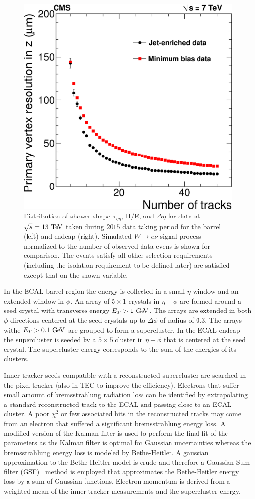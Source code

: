 \begin{figure}[h]
\includegraphics[width=0.32\columnwidth]{figures_chapter4/vertex_resolution}
\caption{Distribution of shower shape $\sigma_{\eta \eta}$, H/E, and $\Delta \eta$ for data at $\sqrt{s}=13~\mathrm{Te\kern -0.1em V}$ taken during $2015$ data taking period for the barrel (left) and endcap (right). Simulated $W \rightarrow e \nu$ signal process normalized to the number of observed data evens is shown for comparison. The events satisfy all other selection requirements (including the isolation requirement to be defined later) are satisfied except that on the shown variable.}
\label{fig:ele_id}
\end{figure}

In the ECAL barrel region the energy is collected in a small $\eta$ window and an extended window in $\phi$.  An array of $5\times1$ crystals in $\eta-\phi$ are formed around a seed crystal with transverse energy $E_{T}>1~\mathrm{Ge\kern -0.1em V}$. The arrays are extended in both $\phi$ directions centered at the seed crystals up to $\Delta \phi$ of radius of $0.3$. The arrays withe $E_{T}>0.1~\mathrm{Ge\kern -0.1em V}$ are grouped to form a supercluster. In the ECAL endcap the supercluster is seeded by a $5\times5$ cluster in $\eta-\phi$ that is centered at the seed crystal. The supercluster energy corresponds to the sum of the energies of its clusters. 

Inner tracker seeds compatible with a reconstructed supercluster are searched in the pixel tracker (also in TEC to improve the efficiency). Electrons that suffer small amount of bremsstrahlung radiation loss can be identified by extrapolating a standard reconstructed track to the ECAL and passing close to an ECAL cluster. A poor $\chi^2$ or few associated hits in the reconstructed tracks may come from an electron that suffered a significant bremsstrahlung energy loss. A modified version of the Kalman filter is used to perform the final fit of the parameters as the Kalman filter is optimal for Gaussian uncertainties whereas the bremsstrahlung energy loss is modeled by Bethe-Heitler.  A gaussian approximation to the Bethe-Heitler model is crude and therefore a Gaussian-Sum filter (GSF)~\cite{Adam:815410} method is employed that approximates the Bethe-Heitler energy loss by a sum of Gaussian functions. Electron momentum is derived from a weighted mean of the inner tracker measurements and the supercluster energy. 

